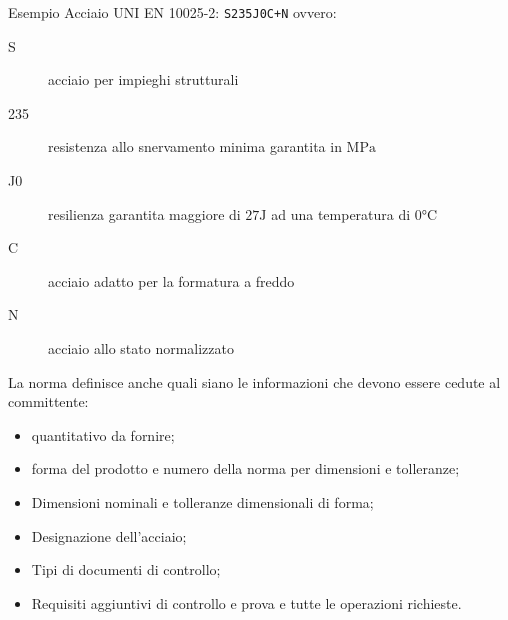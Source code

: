 \begin{example}{Esempio}
Acciaio UNI EN 10025-2: \texttt{S235J0C+N} ovvero:
\begin{description}
\item[S] acciaio per impieghi strutturali
\item[235] resistenza allo snervamento minima garantita in $\unit{\MPa}$
\item[J0] resilienza garantita maggiore di $27\unit{\J}$ ad una temperatura di $0\unit{\celsius}$
\item[C] acciaio adatto per la formatura a freddo
\item[N] acciaio allo stato normalizzato
\end{description}
\end{example}

La norma definisce anche quali siano le informazioni che devono essere cedute al committente:
\begin{itemize}
\item quantitativo da fornire;
\item forma del prodotto e numero della norma per dimensioni e tolleranze;
\item Dimensioni nominali e tolleranze dimensionali di forma;
\item Designazione dell'acciaio;
\item Tipi di documenti di controllo;
\item Requisiti aggiuntivi di controllo e prova e tutte le operazioni richieste.
\end{itemize}
